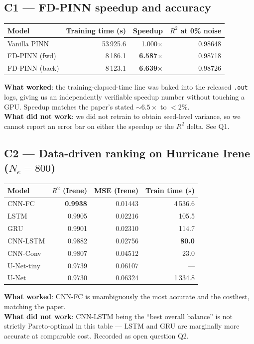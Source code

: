 \documentclass[11pt]{article}
\begin{document}
\subsection{C1 --- FD-PINN speedup and accuracy}
\begin{center}
\begin{tabular}{lrrr}
\toprule
Model & Training time (s) & Speedup & $R^2$ at 0\% noise \\
\midrule
Vanilla PINN     & 53\,925.6 & 1.000$\times$ & 0.98648 \\
FD-PINN (fwd)    &  8\,186.1 & \textbf{6.587$\times$} & 0.98718 \\
FD-PINN (back)   &  8\,123.1 & \textbf{6.639$\times$} & 0.98726 \\
\bottomrule
\end{tabular}
\end{center}
\textbf{What worked}: the training-elapsed-time line was baked into the released \texttt{.out}
logs, giving us an independently verifiable speedup number without touching a GPU. Speedup
matches the paper's stated $\sim 6.5\times$ to $<2\%$.\\
\textbf{What did not work}: we did not retrain to obtain seed-level variance, so we cannot
report an error bar on either the speedup or the $R^2$ delta. See Q1.

\subsection{C2 --- Data-driven ranking on Hurricane Irene ($N_e = 800$)}
\begin{center}
\begin{tabular}{lrrr}
\toprule
Model      & $R^2$ (Irene) & MSE (Irene) & Train time (s) \\
\midrule
CNN-FC     & \textbf{0.9938} & 0.01443 & 4\,536.6 \\
LSTM       & 0.9905 & 0.02216 & 105.5 \\
GRU        & 0.9901 & 0.02310 & 114.7 \\
CNN-LSTM   & 0.9882 & 0.02756 & \textbf{80.0} \\
CNN-Conv   & 0.9807 & 0.04512 & 23.0 \\
U-Net-tiny & 0.9739 & 0.06107 & --- \\
U-Net      & 0.9730 & 0.06324 & 1\,334.8 \\
\bottomrule
\end{tabular}
\end{center}
\textbf{What worked}: CNN-FC is unambiguously the most accurate and the costliest, matching the
paper.\\
\textbf{What did not work}: CNN-LSTM being the ``best overall balance'' is not strictly Pareto-optimal
in this table --- LSTM and GRU are marginally more accurate at comparable cost. Recorded as
open question Q2.
\end{document}
